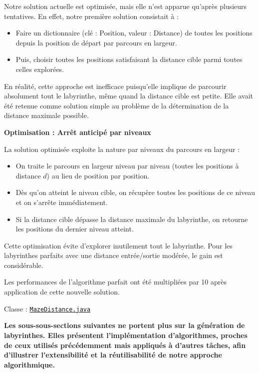 \documentclass{butexFR}
\begin{document}
Notre solution actuelle est optimisée, mais elle n'est apparue qu'après plusieurs tentatives. En effet, notre première solution consistait à :

\begin{itemize}
\item Faire un dictionnaire (clé : Position, valeur : Distance) de toutes les positions depuis la position de départ par parcours en largeur.
\item Puis, choisir toutes les positions satisfaisant la distance cible parmi toutes celles explorées.
\end{itemize}

En réalité, cette approche est inefficace puisqu'elle implique de parcourir absolument tout le labyrinthe, même quand la distance cible est petite. Elle avait été retenue comme solution simple au problème de la détermination de la distance maximale possible.

\textbf{Optimisation : Arrêt anticipé par niveaux}

La solution optimisée exploite la nature par niveaux du parcours en largeur :
\begin{itemize}
    \item On traite le parcours en largeur niveau par niveau (toutes les positions à distance $d$) au lieu de position par position.
    \item Dès qu'on atteint le niveau cible, on récupère toutes les positions de ce niveau et on s'arrête immédiatement.
    \item Si la distance cible dépasse la distance maximale du labyrinthe, on retourne les positions du dernier niveau atteint.
\end{itemize}

Cette optimisation évite d'explorer inutilement tout le labyrinthe. Pour les labyrinthes parfaits avec une distance entrée/sortie modérée, le gain est considérable.

Les performances de l'algorithme parfait ont été multipliées par 10 après application de cette nouvelle solution.

Classe : \href{https://gitlab.univ-lille.fr/sae302/2025/G2_SAE3.3/-/blob/master/labyrinth/src/main/java/fr/univlille/labyrinth/model/algorithm/pathsearch/MazeDistance.java?ref_type=heads}{\texttt{MazeDistance.java}}

\newpage

\textbf{Les sous-sous-sections suivantes ne portent plus sur la génération de labyrinthes. Elles présentent l’implémentation d’algorithmes, proches de ceux utilisés précédemment mais appliqués à d’autres tâches, afin d’illustrer l’extensibilité et la réutilisabilité de notre approche algorithmique.}
\end{document}
